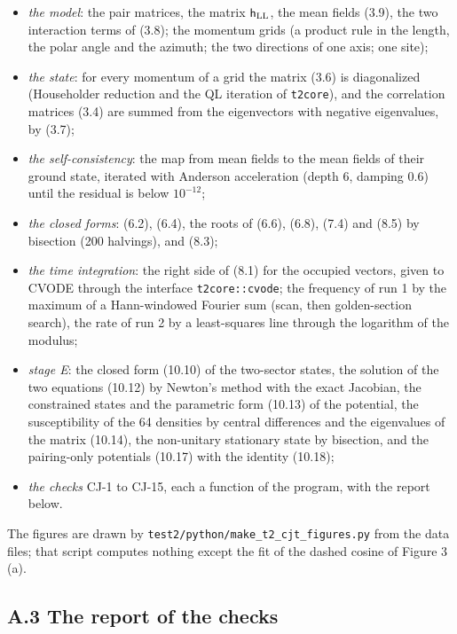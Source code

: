 \documentclass[
  10pt,
]{article}
\providecommand{\tightlist}{%
  \setlength{\itemsep}{0pt}\setlength{\parskip}{0pt}}
\begin{document}
\begin{itemize}
\tightlist
\item
  \emph{the model}: the pair matrices, the matrix
  \(\mathsf h_{\rm LL}\), the mean fields (3.9), the two interaction
  terms of (3.8); the momentum grids (a product rule in the length, the
  polar angle and the azimuth; the two directions of one axis; one
  site);
\item
  \emph{the state}: for every momentum of a grid the matrix (3.6) is
  diagonalized (Householder reduction and the QL iteration of
  \texttt{t2core}), and the correlation matrices (3.4) are summed from
  the eigenvectors with negative eigenvalues, by (3.7);
\item
  \emph{the self-consistency}: the map from mean fields to the mean
  fields of their ground state, iterated with Anderson acceleration
  (depth 6, damping 0.6) until the residual is below \(10^{-12}\);
\item
  \emph{the closed forms}: (6.2), (6.4), the roots of (6.6), (6.8),
  (7.4) and (8.5) by bisection (200 halvings), and (8.3);
\item
  \emph{the time integration}: the right side of (8.1) for the occupied
  vectors, given to CVODE through the interface \texttt{t2core::cvode};
  the frequency of run 1 by the maximum of a Hann-windowed Fourier sum
  (scan, then golden-section search), the rate of run 2 by a
  least-squares line through the logarithm of the modulus;
\item
  \emph{stage E}: the closed form (10.10) of the two-sector states, the
  solution of the two equations (10.12) by Newton's method with the
  exact Jacobian, the constrained states and the parametric form (10.13)
  of the potential, the susceptibility of the 64 densities by central
  differences and the eigenvalues of the matrix (10.14), the non-unitary
  stationary state by bisection, and the pairing-only potentials (10.17)
  with the identity (10.18);
\item
  \emph{the checks} CJ-1 to CJ-15, each a function of the program, with
  the report below.
\end{itemize}

The figures are drawn by \texttt{test2/python/make\_t2\_cjt\_figures.py}
from the data files; that script computes nothing except the fit of the
dashed cosine of Figure 3 (a).

\hypertarget{a.3-the-report-of-the-checks}{%
\subsection{A.3 The report of the
checks}\label{a.3-the-report-of-the-checks}}
\end{document}
